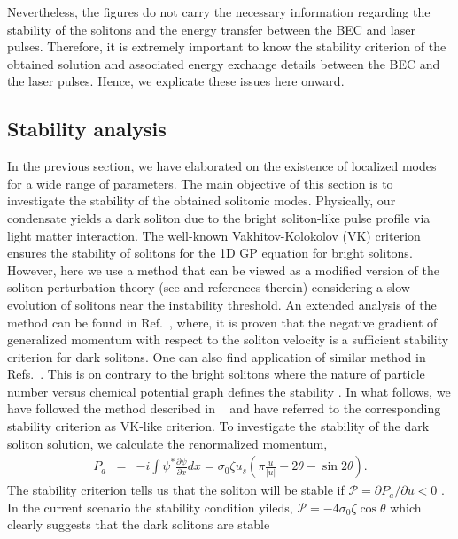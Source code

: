 \documentclass[epj]{svjour}
\begin{document}
Nevertheless, the figures do not carry the necessary information regarding the stability of the solitons and the energy transfer between the BEC and laser pulses. Therefore, it is extremely important to know the stability criterion of the obtained solution and 
associated energy exchange details between the BEC and the laser pulses. Hence, we explicate these issues here onward.



\subsection{Stability analysis}%
In the previous section, we have elaborated on the existence of localized modes for a wide range of parameters. The main objective of this section is to investigate the stability of the obtained solitonic modes.
Physically, our condensate yields a dark soliton due to the bright soliton-like pulse profile via light matter interaction. The well-known Vakhitov-Kolokolov (VK) criterion \cite{vakhitov1973stationary} ensures the stability of solitons for the 1D GP equation for bright solitons. However, here we use a method that can be viewed as a modified version of the soliton perturbation theory (see \cite{kivshar1989} and references therein) considering a slow evolution of solitons near the instability threshold. An extended analysis of the method can be found
in Ref.~\cite{barashenkov}, where, it is proven that the negative gradient of generalized momentum with respect to the soliton velocity is a sufficient stability criterion for dark solitons. One can also find application of similar method in Refs.~\cite{hadi,pendse}. This is on contrary to the bright solitons where the nature of particle number versus chemical potential graph defines the stability \cite{vakhitov1973stationary}. In what follows, we have followed the method described in ~\cite{barashenkov} and have referred to the corresponding stability criterion as VK-like criterion.
To investigate the stability of the dark soliton solution, we calculate the renormalized momentum,
\begin{eqnarray}
P_a &=& -i\int\psi^*\frac{\partial\psi}{\partial x}dx =\sigma_0\zeta u_s\left(\pi\frac{u}{|u|}-2\theta-\sin2\theta\right).\label{momentum}
\end{eqnarray}
The stability criterion tells us that the soliton will be stable if $\mathcal{P}=\partial P_a/\partial u<0$ \cite{barashenkov}. In the current scenario the stability condition yileds, $\mathcal{P}=-4\sigma_0\zeta\cos\theta$ which clearly suggests that the dark solitons are stable
\end{document}
